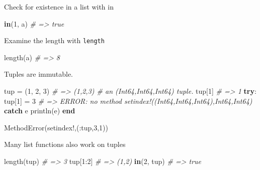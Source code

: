 \documentclass[ignorenonframetext,]{beamer}
\newenvironment{Shaded}{}{}
\newcommand{\KeywordTok}[1]{\textcolor[rgb]{0.00,0.44,0.13}{\textbf{{#1}}}}
\newcommand{\FloatTok}[1]{\textcolor[rgb]{0.25,0.63,0.44}{{#1}}}
\newcommand{\CommentTok}[1]{\textcolor[rgb]{0.38,0.63,0.69}{\textit{{#1}}}}
\newcommand{\NormalTok}[1]{{#1}}
\begin{document}
\begin{frame}[fragile]{Check for existence in a list with in}

\begin{Shaded}
\begin{Highlighting}[]
\KeywordTok{in}\NormalTok{(}\FloatTok{1}\NormalTok{, a) }\CommentTok{# => true}
\end{Highlighting}
\end{Shaded}

\end{frame}

\begin{frame}[fragile]{Examine the length with \texttt{length}}

\begin{Shaded}
\begin{Highlighting}[]
\NormalTok{length(a) }\CommentTok{# => 8}
\end{Highlighting}
\end{Shaded}

\end{frame}

\begin{frame}[fragile]{Tuples are immutable.}

\begin{Shaded}
\begin{Highlighting}[]
\NormalTok{tup = (}\FloatTok{1}\NormalTok{, }\FloatTok{2}\NormalTok{, }\FloatTok{3}\NormalTok{) }\CommentTok{# => (1,2,3) # an (Int64,Int64,Int64) tuple.}
\NormalTok{tup[}\FloatTok{1}\NormalTok{] }\CommentTok{# => 1}
\KeywordTok{try}\NormalTok{:}
    \NormalTok{tup[}\FloatTok{1}\NormalTok{] = }\FloatTok{3} \CommentTok{# => ERROR: no method setindex!((Int64,Int64,Int64),Int64,Int64)}
\KeywordTok{catch} \NormalTok{e}
    \NormalTok{println(e)}
\KeywordTok{end}
\end{Highlighting}
\end{Shaded}

\begin{Shaded}
\begin{Highlighting}[]
\NormalTok{MethodError(setindex!,(:tup,}\FloatTok{3}\NormalTok{,}\FloatTok{1}\NormalTok{))}
\end{Highlighting}
\end{Shaded}

\end{frame}

\begin{frame}[fragile]{Many list functions also work on tuples}

\begin{Shaded}
\begin{Highlighting}[]
\NormalTok{length(tup) }\CommentTok{# => 3}
\NormalTok{tup[}\FloatTok{1}\NormalTok{:}\FloatTok{2}\NormalTok{] }\CommentTok{# => (1,2)}
\KeywordTok{in}\NormalTok{(}\FloatTok{2}\NormalTok{, tup) }\CommentTok{# => true}
\end{Highlighting}
\end{Shaded}

\end{frame}
\end{document}
